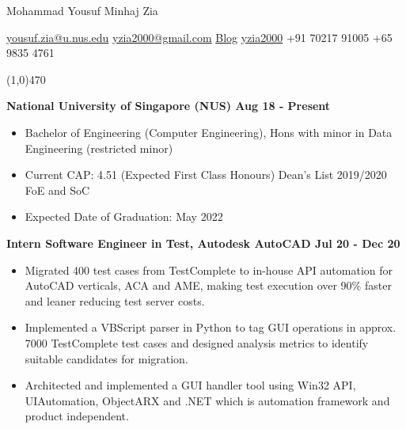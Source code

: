\documentclass[11pts]{article}
\begin{document}
\centerline{{\Huge \sc  Mohammad Yousuf Minhaj Zia}}
\centerline{\href{mailto:yousuf.zia@u.nus.edu}{yousuf.zia@u.nus.edu} \textbar
\hspace{1pt} \href{mailto:yzia2000@gmail.com}{yzia2000@gmail.com} \textbar
\hspace{1pt} \href{https://yzia2000.github.io/blog}{Blog} \textbar
\hspace{1pt} \faGithub \hspace{1pt}
\href{https://github.com/yzia2000}{yzia2000} \textbar
\hspace{1pt} \href{https://www.linkedin.com/in/mohammad-yousuf-minhaj-zia-ab555396}{\faLinkedin} \textbar
\hspace{1pt} +91 70217 91005 \textbar
\hspace{1pt} +65 9835 4761 
}
\noindent
\line(1,0){470}\\


\smallskip

\noindent \centerline{\large \bf National University of Singapore (NUS) \hfill Aug 18 - Present}
\begin{itemize}
    \item Bachelor of Engineering (Computer Engineering), Hons with minor in Data Engineering (restricted minor)
    \item Current CAP: 4.51 (Expected First Class Honours) Dean's List 2019/2020 FoE and SoC
    \item Expected Date of Graduation: May 2022
\end{itemize}
\smallskip

\smallskip

\noindent \centerline{\large \bf Intern Software Engineer in Test, Autodesk AutoCAD \hfill Jul 20 - Dec 20}
\begin{itemize}
    \item Migrated 400 test cases from TestComplete to in-house API automation for AutoCAD verticals, ACA and AME, making test execution over 90\% faster and leaner reducing test server costs.
    \item Implemented a VBScript parser in Python to tag GUI operations in approx. 7000 TestComplete test cases and designed analysis metrics to identify suitable candidates for migration.
    \item Architected and implemented a GUI handler tool using Win32 API, UIAutomation, ObjectARX and .NET which is automation framework and product independent.
\end{itemize}
\smallskip
\end{document}
